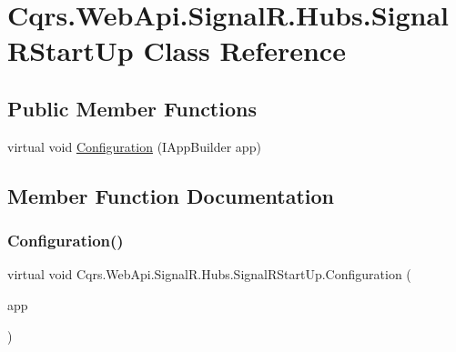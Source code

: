 \hypertarget{classCqrs_1_1WebApi_1_1SignalR_1_1Hubs_1_1SignalRStartUp}{}\section{Cqrs.\+Web\+Api.\+Signal\+R.\+Hubs.\+Signal\+R\+Start\+Up Class Reference}
\label{classCqrs_1_1WebApi_1_1SignalR_1_1Hubs_1_1SignalRStartUp}
\subsection*{Public Member Functions}
\begin{DoxyCompactItemize}
\item 
virtual void \hyperlink{classCqrs_1_1WebApi_1_1SignalR_1_1Hubs_1_1SignalRStartUp_a0d670a1f640c6fd19edda463fe708879_a0d670a1f640c6fd19edda463fe708879}{Configuration} (I\+App\+Builder app)
\end{DoxyCompactItemize}


\subsection{Member Function Documentation}
\mbox{\label{classCqrs_1_1WebApi_1_1SignalR_1_1Hubs_1_1SignalRStartUp_a0d670a1f640c6fd19edda463fe708879_a0d670a1f640c6fd19edda463fe708879}} 
\subsubsection{\texorpdfstring{Configuration()}{Configuration()}}
{\footnotesize\ttfamily virtual void Cqrs.\+Web\+Api.\+Signal\+R.\+Hubs.\+Signal\+R\+Start\+Up.\+Configuration (\begin{DoxyParamCaption}\item[{I\+App\+Builder}]{app }\end{DoxyParamCaption})\hspace{0.3cm}{\ttfamily [virtual]}}

